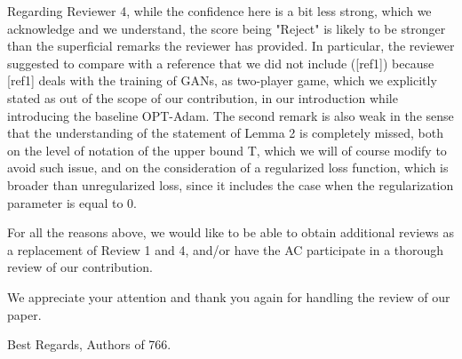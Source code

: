 \documentclass{article}
\begin{document}
Regarding Reviewer 4, while the confidence here is a bit less strong, which we acknowledge and we understand, the score being "Reject" is likely to be stronger than the superficial remarks the reviewer has provided. In particular, the reviewer suggested to compare with a reference that we did not include ([ref1]) because [ref1] deals with the training of GANs, as two-player game, which we explicitly stated as out of the scope of our contribution, in our introduction while introducing the baseline OPT-Adam. The second remark is also weak in the sense that the understanding of the statement of Lemma 2 is completely missed, both on the level of notation of the upper bound T, which we will of course modify to avoid such issue, and on the consideration of a regularized loss function, which is broader than unregularized loss, since it includes the case when the regularization parameter is equal to 0.

For all the reasons above, we would like to be able to obtain additional reviews as a replacement of Review 1 and 4, and/or have the AC participate in a thorough review of our contribution.

We appreciate your attention and thank you again for handling the review of our paper. 

Best Regards,
Authors of 766.
\end{document}
